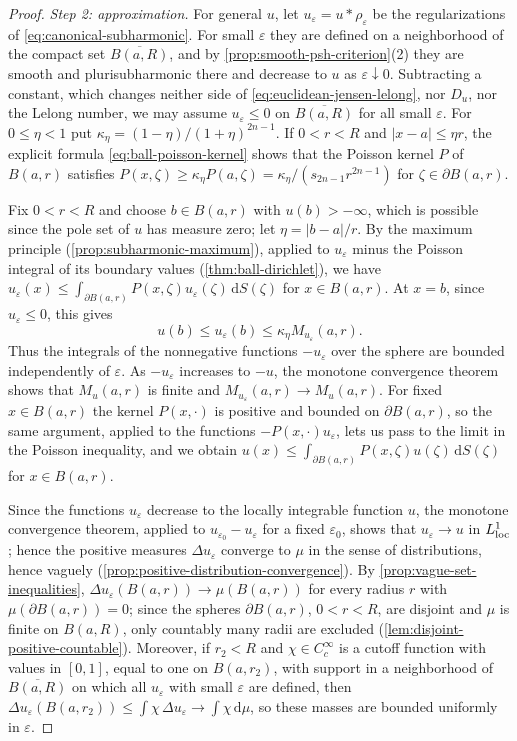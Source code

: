 \begin{proof}
\emph{Step 2: approximation.} For general $u$, let $u_\varepsilon=u*\rho_\varepsilon$ be the regularizations of \eqref{eq:canonical-subharmonic}. For small $\varepsilon$ they are defined on a neighborhood of the compact set $\overline{B(a,R)}$, and by \cref{prop:smooth-psh-criterion}(2) they are smooth and plurisubharmonic there and decrease to $u$ as $\varepsilon\downarrow0$. Subtracting a constant, which changes neither side of \eqref{eq:euclidean-jensen-lelong}, nor $D_u$, nor the Lelong number, we may assume $u_\varepsilon\leq0$ on $\overline{B(a,R)}$ for all small $\varepsilon$. For $0\leq\eta<1$ put $\kappa_\eta=(1-\eta)/(1+\eta)^{2n-1}$. If $0<r<R$ and $|x-a|\leq\eta r$, the explicit formula \eqref{eq:ball-poisson-kernel} shows that the Poisson kernel $P$ of $B(a,r)$ satisfies $P(x,\zeta)\geq\kappa_\eta P(a,\zeta)=\kappa_\eta/(s_{2n-1}r^{2n-1})$ for $\zeta\in\partial B(a,r)$.

Fix $0<r<R$ and choose $b\in B(a,r)$ with $u(b)>-\infty$, which is possible since the pole set of $u$ has measure zero; let $\eta=|b-a|/r$. By the maximum principle (\cref{prop:subharmonic-maximum}), applied to $u_\varepsilon$ minus the Poisson integral of its boundary values (\cref{thm:ball-dirichlet}), we have $u_\varepsilon(x)\leq\int_{\partial B(a,r)}P(x,\zeta)u_\varepsilon(\zeta)\,\mathrm dS(\zeta)$ for $x\in B(a,r)$. At $x=b$, since $u_\varepsilon\leq0$, this gives
\[
 u(b)\leq u_\varepsilon(b)\leq\kappa_\eta M_{u_\varepsilon}(a,r).
\]
Thus the integrals of the nonnegative functions $-u_\varepsilon$ over the sphere are bounded independently of $\varepsilon$. As $-u_\varepsilon$ increases to $-u$, the monotone convergence theorem shows that $M_u(a,r)$ is finite and $M_{u_\varepsilon}(a,r)\to M_u(a,r)$. For fixed $x\in B(a,r)$ the kernel $P(x,\cdot)$ is positive and bounded on $\partial B(a,r)$, so the same argument, applied to the functions $-P(x,\cdot)u_\varepsilon$, lets us pass to the limit in the Poisson inequality, and we obtain $u(x)\leq\int_{\partial B(a,r)}P(x,\zeta)u(\zeta)\,\mathrm dS(\zeta)$ for $x\in B(a,r)$.

Since the functions $u_\varepsilon$ decrease to the locally integrable function $u$, the monotone convergence theorem, applied to $u_{\varepsilon_0}-u_\varepsilon$ for a fixed $\varepsilon_0$, shows that $u_\varepsilon\to u$ in $L^1_{\mathrm{loc}}$; hence the positive measures $\Delta u_\varepsilon$ converge to $\mu$ in the sense of distributions, hence vaguely (\cref{prop:positive-distribution-convergence}). By \cref{prop:vague-set-inequalities}, $\Delta u_\varepsilon(B(a,r))\to\mu(B(a,r))$ for every radius $r$ with $\mu(\partial B(a,r))=0$; since the spheres $\partial B(a,r)$, $0<r<R$, are disjoint and $\mu$ is finite on $B(a,R)$, only countably many radii are excluded (\cref{lem:disjoint-positive-countable}). Moreover, if $r_2<R$ and $\chi\in C^\infty_c$ is a cutoff function with values in $[0,1]$, equal to one on $B(a,r_2)$, with support in a neighborhood of $\overline{B(a,R)}$ on which all $u_\varepsilon$ with small $\varepsilon$ are defined, then $\Delta u_\varepsilon(B(a,r_2))\leq\int\chi\,\Delta u_\varepsilon\to\int\chi\,\mathrm d\mu$, so these masses are bounded uniformly in $\varepsilon$.


\end{proof}
